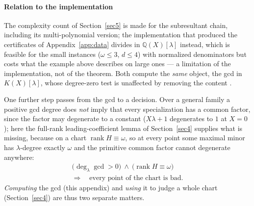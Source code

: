 \documentclass[journal]{IEEEtran}
\theoremstyle{plainn}
\theoremstyle{remark}
\newcommand{\rank}{\operatorname{rank}}
\begin{document}
\paragraph{Relation to the implementation}\label{appBC:sub:impl}
The complexity count of Section~\ref{sec5} is made for the subresultant chain, including its
multi-polynomial version; the implementation that produced the certificates of
Appendix~\ref{app:data} divides in $\mathbb{Q}(X)[\lambda]$ instead, which is feasible for the small
instances ($\omega\le3$, $d\le4$) with normalized denominators but costs what the example above
describes on large ones --- a limitation of the implementation, not of the theorem. Both compute the
\emph{same} object, the gcd in $K(X)[\lambda]$, whose degree-zero test is unaffected by removing the
content \cite{vzgg03}.

One further step passes from the gcd to a decision. Over a general family a positive gcd degree does
\emph{not} imply that every specialization has a common factor, since the factor may degenerate to a
constant ($X\lambda+1$ degenerates to $1$ at $X=0$); here the full-rank leading-coefficient lemma of
Section~\ref{sec4} supplies what is missing, because on a chart $\rank H\equiv\omega$, so at every
point some maximal minor has $\lambda$-degree exactly $\omega$ and the primitive common factor cannot
degenerate anywhere:
\[
\begin{gathered}
\bigl(\deg_\lambda\gcd>0\bigr)\ \wedge\ \bigl(\rank H\equiv\omega\bigr)\\
\Longrightarrow\quad \text{every point of the chart is bad}.
\end{gathered}
\]
\emph{Computing} the gcd (this appendix) and \emph{using} it to judge a whole chart
(Section~\ref{sec4}) are thus two separate matters.
\end{document}

